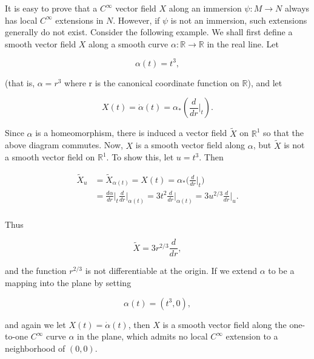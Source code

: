 \begin{remarks}\label{thm:1.52}
	It is easy to prove that a $C^{\infty}$ vector field $X$ along an immersion $\psi: M \to N$ always has local $C^{\infty}$ extensions in $N$. However, if $\psi$ is not an immersion, such extensions generally do not exist. Consider the following example. We shall first define a smooth vector field $X$ along a smooth curve $\alpha: \mathbb{R} \to \mathbb{R}$ in the real line. Let

	\begin{equation}
		\tag{1}\label{eq:1.52:1}
		\alpha(t)=t^{3},
	\end{equation}

	(that is,  $ \alpha = r^{3} $ where r is the canonical coordinate function on  $ \mathbb{R} $), and let

	\begin{equation}
		\tag{2}\label{eq:1.52:2}
		X(t)=\dot{\alpha}(t)=\alpha_{*}\left(\frac{d}{d r}\bigg|_{t}\right).
	\end{equation}

	\begin{center}
	\end{center}

	Since $\alpha$ is a homeomorphism, there is induced a vector field $\tilde{X}$ on $\mathbb{R}^{1}$ so that the above diagram commutes. Now, $X$ is a smooth vector field along $\alpha$, but $\tilde{X}$ is not a smooth vector field on $\mathbb{R}^{1}$. To show this, let $u = t^{3}$. Then

	\begin{equation}
		\tag{3}\label{eq:1.52:3}
		\begin{aligned}{\tilde{X}_{u}}&{{}=\tilde{X}_{\alpha(t)}=X(t)=\alpha_{*}\bigg(\frac{d}{d r}\bigg|_{t}\bigg)}\\ {}&{{}=\frac{d\alpha}{d r}\bigg|_{t}\frac{d}{d r}\bigg|_{\alpha(t)}=3t^{2}\frac{d}{d r}\bigg|_{\alpha(t)}=3u^{2/3}\frac{d}{d r}\bigg|_{u}.}\\ \end{aligned}
	\end{equation}

	Thus

	\begin{equation}
		\tag{4}\label{eq:1.52:4}
		\tilde{X}=3r^{2/3}\frac{d}{d r},
	\end{equation}

	and the function  $ r^{2/3} $ is not differentiable at the origin. If we extend  $ \alpha $ to be a mapping into the plane by setting

	\begin{equation}
		\tag{5}\label{eq:1.52:5}
		\alpha(t)=(t^{3},0),
	\end{equation}

	and again we let $X(t)=\dot{\alpha}(t)$, then $X$ is a smooth vector field along the one-to-one $C^{\infty}$ curve $\alpha$ in the plane, which admits no local $C^{\infty}$ extension to a neighborhood of $(0,0)$.

\end{remarks}

